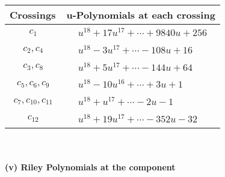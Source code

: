 \documentclass[1p]{elsarticle_modified}
\theoremstyle{definition}
\begin{document}
\begin{tabular}{m{50pt}|m{274pt}}
Crossings & \hspace{64pt}u-Polynomials at each crossing \\
\hline $$\begin{aligned}c_{1}\end{aligned}$$&$\begin{aligned}
&u^{18}+17 u^{17}+\cdots+9840 u+256
\end{aligned}$\\
\hline $$\begin{aligned}c_{2},c_{4}\end{aligned}$$&$\begin{aligned}
&u^{18}-3 u^{17}+\cdots-108 u+16
\end{aligned}$\\
\hline $$\begin{aligned}c_{3},c_{8}\end{aligned}$$&$\begin{aligned}
&u^{18}+5 u^{17}+\cdots-144 u+64
\end{aligned}$\\
\hline $$\begin{aligned}c_{5},c_{6},c_{9}\end{aligned}$$&$\begin{aligned}
&u^{18}-10 u^{16}+\cdots+3 u+1
\end{aligned}$\\
\hline $$\begin{aligned}c_{7},c_{10},c_{11}\end{aligned}$$&$\begin{aligned}
&u^{18}+u^{17}+\cdots-2 u-1
\end{aligned}$\\
\hline $$\begin{aligned}c_{12}\end{aligned}$$&$\begin{aligned}
&u^{18}+19 u^{17}+\cdots-352 u-32
\end{aligned}$\\
\hline
\end{tabular}\\~\\
\newpage\renewcommand{\arraystretch}{1}
\flushleft \textbf{(v) Riley Polynomials at the component}\newline \\
\end{document}
